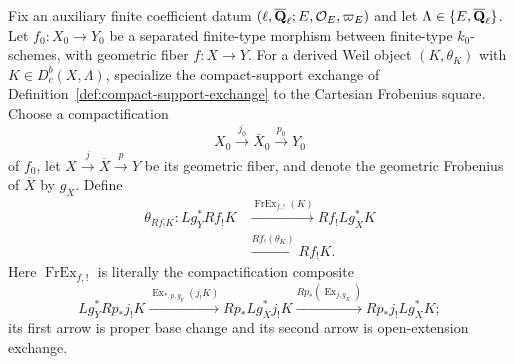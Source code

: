 
\begin{definition}
\label{def:weil-compact-support-object}


Fix an auxiliary finite coefficient datum
\((\ell,\overline{\mathbf Q}_\ell;E,\mathcal O_E,\varpi_E)\) and let
\(\Lambda\in\{E,\overline{\mathbf Q}_\ell\}\).  Let \(f_0:X_0\to Y_0\) be a separated
finite-type morphism between finite-type \(k_0\)-schemes, with geometric
fiber \(f:X\to Y\).
For a derived Weil object \((K,\theta_K)\) with
\(K\in D^b_c(X,\Lambda)\), specialize the compact-support exchange of
Definition~\ref{def:compact-support-exchange} to the Cartesian Frobenius
square.  Choose a compactification
\[
 X_0\xrightarrow{j_0}\overline X_0\xrightarrow{p_0}Y_0
\]
of \(f_0\), let
\(X\xrightarrow{j}\overline X\xrightarrow{p}Y\) be its geometric fiber,
and denote the geometric Frobenius of \(\overline X\) by
\(g_{\overline X}\).  Define
\[
\begin{aligned}
 \theta_{Rf_!K}:Lg_Y^*Rf_!K
 &\xrightarrow{\operatorname{FrEx}_{f,!}(K)}Rf_!Lg_X^*K\\
 &\xrightarrow{Rf_!(\theta_K)}Rf_!K.
\end{aligned}
\]
Here \(\operatorname{FrEx}_{f,!}\) is literally the compactification
composite
\[
 Lg_Y^*Rp_*j_!K
 \xrightarrow{\operatorname{Ex}_{*,p,g_Y}(j_!K)}
 Rp_*Lg_{\overline X}^*j_!K
 \xrightarrow{Rp_*(\operatorname{Ex}_{j,g_{\overline X}})}
 Rp_*j_!Lg_X^*K;
\]
its first arrow is proper base change and its second arrow is
open-extension exchange.
\end{definition}


